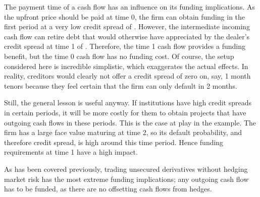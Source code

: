 \documentclass[main.tex]{subfiles}
\begin{document}
        The payment time of a cash flow has an influence on its funding implications.
        As the upfront price should be paid at time 0, 
        the firm can obtain funding in the first period at a very low credit spread of .
        However, the intermediate incoming cash flow can retire debt
        that would otherwise have appreciated 
        by the dealer's credit spread at time 1 of .
        Therefore, the time 1 cash flow provides a funding benefit,
        but the time 0 cash flow has no funding cost.
        Of course, the setup considered here is incredible simplistic,
        which exaggerates the actual effects.
        In reality, creditors would clearly not offer a credit spread of zero on, say,
        1 month tenors because they feel certain that the firm can only default in 2 months.

        Still, the general lesson is useful anyway.
        If institutions have high credit spreads in certain periods,
        it will be more costly for them to obtain projects 
        that have outgoing cash flows in these periods.
        This is the case at play in the example.
        The firm has a large face value maturing at time 2, 
        so its default probability, and therefore credit spread,
        is high around this time period.
        Hence funding requirements at time 1 have a high impact.

        As has been covered previously, trading unsecured derivatives without hedging market risk
        has the most extreme funding implications;
        any outgoing cash flow has to be funded, 
        as there are no offsetting cash flows from hedges.
\end{document}

